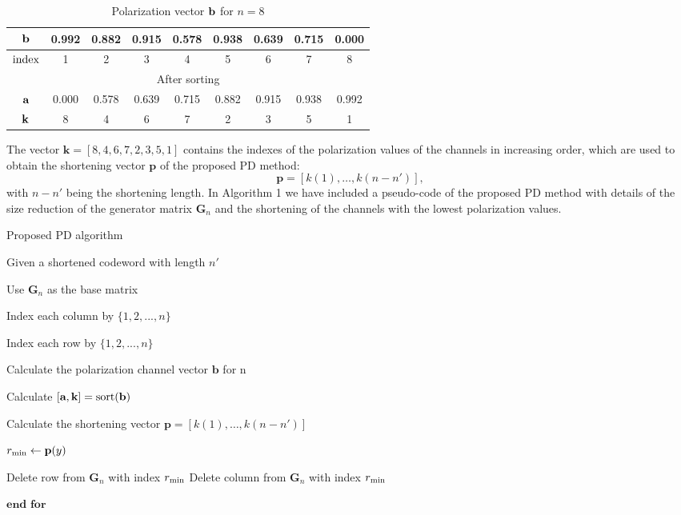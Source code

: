 \documentclass[10pt,twocolumn]{IEEEtran}
\begin{document}
\begin{table}[htb]
\vspace{-0.75 em} \caption{\label{tabela}Polarization vector $\rm
\textbf{b}$ for $n = 8$}
\begin{center}
\vspace{-0.75 em} \scriptsize
\begin{tabular}{|c||c|c|c|c|c|c|c|c|}\hline
\textit{$\rm
\textbf{b}$}&0.992&0.882&0.915&0.578&0.938&0.639&0.715&0.000\\\hline
\textit{$\rm index$}&1&2&3&4&5&6&7&8\\\hline
\multicolumn{9}{|c|}{After sorting} \\ \hline \textit{$\rm
\textbf{a}$}&0.000&0.578&0.639&0.715&0.882&0.915&0.938&0.992\\\hline
\textit{$\rm \textbf{k}$}&8&4&6&7&2&3&5&1\\\hline
\end{tabular}
\scriptsize \vspace{-0.5 em}
\end{center}
\end{table}

The vector $\textbf{k} = [8,4,6,7,2,3,5,1]$ contains the indexes of
the polarization values of the channels in increasing order, which
are used to obtain the shortening vector $\textbf{p}$ of the
proposed PD method:
\begin{equation}
\textbf{p}=[k(1), \ldots , k(n-n')],
\end{equation}
with $n-n'$ being the shortening length. In Algorithm 1 we have
included a pseudo-code of the proposed PD method with details of the
size reduction of the generator matrix $\textbf{G}_n$ and the
shortening of the channels with the lowest polarization values.

\begin{algorithm}
\caption{Proposed PD algorithm}
\begin{algorithmic}[1]
\State Given a shortened codeword with length $n'$

\State Use $\textbf{G}_n$ as the base matrix

\State Index each column by $\{1,2,...,n\}$

\State Index each row by $\{1,2,...,n\}$

\State Calculate the polarization channel vector $\textbf{b}$ for n

\State Calculate $[\textbf{a},\textbf{k}]= \rm sort(\textbf{b})$

\State Calculate the shortening vector $\textbf{p}=[k(1), \ldots ,
k(n-n')]$


\State $r_{\rm min} \leftarrow \textbf{p}(y)$

\State Delete row from $\textbf{G}_n$ with index $r_{\rm min}$
\State Delete column from $\textbf{G}_n$ with index $r_{\rm min}$
\EndFor

\State $\textbf{end for}$
\end{algorithmic}
\end{algorithm}
\end{document}
